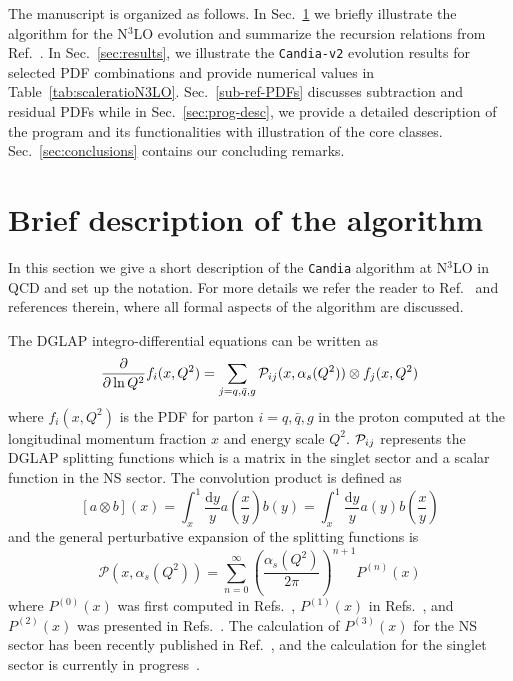 \documentclass[preprint,12pt]{elsarticle}
\newcommand{\dd}{\mathrm{d}}
\begin{document}
The manuscript is organized as follows.
In Sec.~\ref{sec:program-description} we briefly illustrate the algorithm for the N$^3$LO evolution and summarize the recursion relations from Ref.~\cite{Hampson:2025pvi}. In Sec.~\ref{sec:results}, we illustrate the \texttt{Candia-v2} evolution results for selected PDF combinations and provide numerical values in Table~\ref{tab:scaleratioN3LO}. Sec.~\ref{sub-ref-PDFs} discusses subtraction and residual PDFs while in Sec.~\ref{sec:prog-desc}, we provide a detailed description of the program and its functionalities with illustration of the core classes.  
Sec.~\ref{sec:conclusions} contains our concluding remarks. 



\section{Brief description of the algorithm}
\label{sec:program-description}

In this section we give a short description of the \texttt{Candia} algorithm at N$^3$LO in QCD and set up the notation. For more details we refer the reader to Ref.~\cite{Hampson:2025pvi} and references therein, where all formal aspects of the algorithm are discussed.   

The DGLAP integro-differential equations can be written as
\begin{equation}    
\frac{\partial}{\partial\ln Q^{2}}f_i(x,Q^{2}) = \sum_{j=q,\bar{q},g} {\cal P}_{ij}(x,\alpha_{s}(Q^2)) \otimes f_j(x,Q^{2})
\label{DGLAP}
\end{equation}
where $f_i(x,Q^2)$ is the PDF for parton $i=q,\bar{q}, g$ in the proton computed at the longitudinal momentum fraction $x$ and energy scale $Q^2$. ${\cal P}_{ij}$ represents the DGLAP splitting functions which is a matrix in the singlet sector and a scalar function in the NS sector.  
%
The convolution product is defined as
%
\begin{equation}
  \left[a \otimes b\right](x) = \int_{x}^{1}\frac{\dd y}{y}a\left(\frac{x}{y}\right)b(y) = \int_{x}^{1}\frac{\dd y}{y}a(y)b\left(\frac{x}{y}\right)
\end{equation}
%
and the general perturbative expansion of the splitting functions is 
\begin{equation}
{\mathcal P}(x,\alpha_s(Q^2)) = \sum_{n=0}^{\infty} \left(\frac{\alpha_s(Q^2)}{2\pi}\right)^{n+1} P^{(n)}(x)
\label{kernel-expansion}
\end{equation}
%
where $P^{(0)}(x)$ was first computed in Refs.~\cite{Gross:1973id,Politzer:1974fr,Altarelli:1977zs}, $P^{(1)}(x)$ in Refs.~\cite{Floratos:1977au,Floratos:1978ny,Gonzalez-Arroyo:1979guc,Gonzalez-Arroyo:1979qht,Curci:1980uw,Furmanski:1980cm,Floratos:1981hs,Hamberg:1991qt}, and $P^{(2)}(x)$ was presented in Refs.~\cite{Moch:2004pa,Vogt:2004mw}. The calculation of $P^{(3)}(x)$ for the NS sector has been recently published in Ref.~\cite{Gehrmann:2026qbl}, and the calculation for the singlet sector is currently in progress~\cite{Gracey:1994nn,Davies:2016jie,Moch:2017uml,Gehrmann:2023cqm,Falcioni:2023tzp,Gehrmann:2023iah,Kniehl:2025ttz}.  
\end{document}
